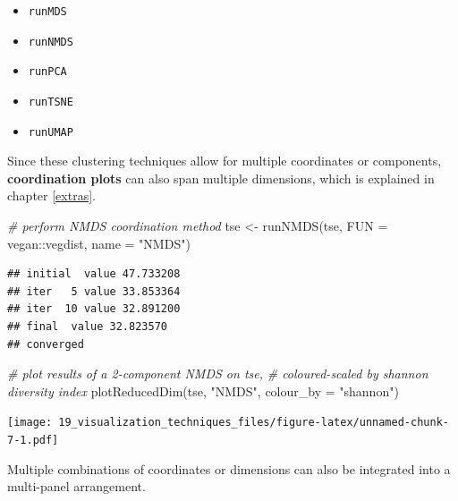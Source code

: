 \documentclass[
]{book}
\newenvironment{Shaded}{\begin{snugshade}}{\end{snugshade}}
\newcommand{\AttributeTok}[1]{\textcolor[rgb]{0.77,0.63,0.00}{#1}}
\newcommand{\CommentTok}[1]{\textcolor[rgb]{0.56,0.35,0.01}{\textit{#1}}}
\newcommand{\FunctionTok}[1]{\textcolor[rgb]{0.00,0.00,0.00}{#1}}
\newcommand{\NormalTok}[1]{#1}
\newcommand{\OtherTok}[1]{\textcolor[rgb]{0.56,0.35,0.01}{#1}}
\newcommand{\SpecialCharTok}[1]{\textcolor[rgb]{0.00,0.00,0.00}{#1}}
\newcommand{\StringTok}[1]{\textcolor[rgb]{0.31,0.60,0.02}{#1}}
\providecommand{\tightlist}{%
  \setlength{\itemsep}{0pt}\setlength{\parskip}{0pt}}
\begin{document}
\begin{itemize}
\tightlist
\item
  \texttt{runMDS}
\item
  \texttt{runNMDS}
\item
  \texttt{runPCA}
\item
  \texttt{runTSNE}
\item
  \texttt{runUMAP}
\end{itemize}

Since these clustering techniques allow for multiple coordinates or
components, \textbf{coordination plots} can also span multiple dimensions,
which is explained in chapter \ref{extras}.

\begin{Shaded}
\begin{Highlighting}[]
\CommentTok{\# perform NMDS coordination method}
\NormalTok{tse }\OtherTok{\textless{}{-}} \FunctionTok{runNMDS}\NormalTok{(tse,}
               \AttributeTok{FUN =}\NormalTok{ vegan}\SpecialCharTok{::}\NormalTok{vegdist,}
               \AttributeTok{name =} \StringTok{"NMDS"}\NormalTok{)}
\end{Highlighting}
\end{Shaded}

\begin{verbatim}
## initial  value 47.733208 
## iter   5 value 33.853364
## iter  10 value 32.891200
## final  value 32.823570 
## converged
\end{verbatim}

\begin{Shaded}
\begin{Highlighting}[]
\CommentTok{\# plot results of a 2{-}component NMDS on tse,}
\CommentTok{\# coloured{-}scaled by shannon diversity index}
\FunctionTok{plotReducedDim}\NormalTok{(tse, }\StringTok{"NMDS"}\NormalTok{, }\AttributeTok{colour\_by =} \StringTok{"shannon"}\NormalTok{)}
\end{Highlighting}
\end{Shaded}

\texttt{[image: 19\_visualization\_techniques\_files/figure-latex/unnamed-chunk-7-1.pdf]}

Multiple combinations of coordinates or dimensions can also be integrated into a multi-panel arrangement.
\end{document}
